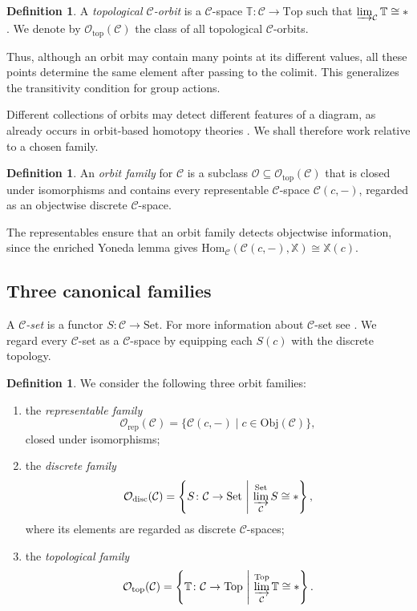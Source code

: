 \documentclass[12pt]{amsart}
\theoremstyle{definition}
\newtheorem{defi}[teo]{Definition}
\theoremstyle{remark}
\numberwithin{figure}{section}%
\newcommand{\CC}{\mathcal{C}}
\newcommand{\Top}{\mathrm{Top}}
\newcommand{\X}{\mathbb{X}}
\newcommand{\T}{\mathbb{T}}
\newcommand{\Hom}{\mathrm{Hom}}
\newcommand{\Obj}{\mathrm{Obj}}
\newcommand{\Set}{\mathrm{Set}}
\begin{document}
\begin{defi}
A \emph{topological $\CC$-orbit} is a $\CC$-space
$\T\colon\CC\to\Top$ such that
$\varinjlim_{\CC}\T\cong *$. We denote by
$\mathcal O_{\mathrm{top}}(\CC)$ the class of all topological
$\CC$-orbits.
\end{defi}

Thus, although an orbit may contain many points at its different values,
all these points determine the same element after passing to the colimit.
This generalizes the transitivity condition for group actions.

Different collections of orbits may detect different features of a
diagram, as already occurs in orbit-based homotopy theories
\cite{Farjoun_Hom,Housden}. We shall therefore work relative to a chosen
family.

\begin{defi}
An \emph{orbit family} for $\CC$ is a subclass
$\mathcal O\subseteq\mathcal O_{\mathrm{top}}(\CC)$ that is closed
under isomorphisms and contains every representable $\CC$-space
$\CC(c,-)$, regarded as an objectwise discrete $\CC$-space.
\end{defi}

The representables ensure that an orbit family detects objectwise
information, since the enriched Yoneda lemma gives
$\Hom_{\CC}(\CC(c,-),\X)\cong\X(c)$.

\subsection{Three canonical families}

A \emph{$\CC$-set} is a functor $S\colon\CC\to\Set$. For more information about $\CC$-set see \cite{Webb2023,CalderonEtAl2026}. We regard every
$\CC$-set as a $\CC$-space by equipping each $S(c)$ with the discrete
topology.

\begin{defi}\label{def:canonical-orbit-families}
We consider the following three orbit families:
\begin{enumerate}
    \item the \emph{representable family}
    \[
    \mathcal O_{\mathrm{rep}}(\CC)
    =
    \{\CC(c,-)\mid c\in\Obj(\CC)\},
    \]
    closed under isomorphisms;

    \item the \emph{discrete family}
    \[
    \mathcal O_{\mathrm{disc}}(\CC)
    =
    \left\{
    S\colon\CC\to\Set
    \ \middle|\
    \varinjlim_{\CC}^{\Set}S\cong *
    \right\},
    \]
    where its elements are regarded as discrete $\CC$-spaces;

    \item the \emph{topological family}
    \[
    \mathcal O_{\mathrm{top}}(\CC)
    =
    \left\{
    \T\colon\CC\to\Top
    \ \middle|\
    \varinjlim_{\CC}^{\Top}\T\cong *
    \right\}.
    \]
\end{enumerate}
\end{defi}
\end{document}
